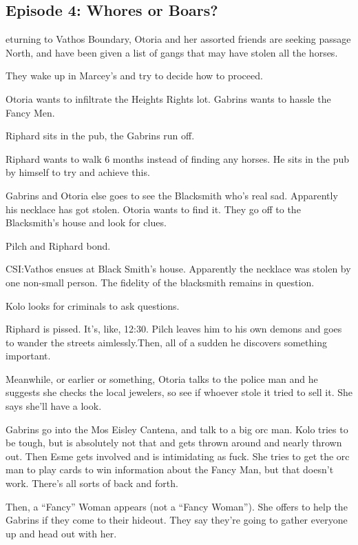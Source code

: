 \subsection{Episode 4: Whores or Boars?}

eturning to Vathos Boundary, Otoria and her assorted friends are seeking passage North, and have been given a list of gangs that may have stolen all the horses.\medskip

They wake up in Marcey’s and try to decide how to proceed.\medskip

Otoria wants to infiltrate the Heights Rights lot. Gabrins wants to hassle the Fancy Men.\medskip

Riphard sits in the pub, the Gabrins run off.\medskip

Riphard wants to walk 6 months instead of finding any horses. He sits in the pub by himself to try and achieve this.\medskip

Gabrins and Otoria else goes to see the Blacksmith who’s real sad. Apparently his necklace has got stolen. Otoria wants to find it. They go off to the Blacksmith’s house and look for clues.\medskip

Pilch and Riphard bond.\medskip

CSI:Vathos ensues at Black Smith’s house. Apparently the necklace was stolen by one non-small person. The fidelity of the blacksmith remains in question.\medskip

Kolo looks for criminals to ask questions.\medskip

Riphard is pissed. It’s, like, 12:30. Pilch leaves him to his own demons and goes to wander the streets aimlessly.Then, all of a sudden he discovers something important.\medskip

Meanwhile, or earlier or something, Otoria talks to the police man and he suggests she checks the local jewelers, so see if whoever stole it tried to sell it. She says she’ll have a look.\medskip

Gabrins go into the Mos Eisley Cantena, and talk to a big orc man. Kolo tries to be tough, but is absolutely not that and gets thrown around and nearly thrown out. Then Esme gets involved and is intimidating as fuck. She tries to get the orc man to play cards to win information about the Fancy Man, but that doesn’t work. There’s all sorts of back and forth.\medskip

Then, a “Fancy” Woman appears (not a “Fancy Woman”). She offers to help the Gabrins if they come to their hideout. They say they’re going to gather everyone up and head out with her.\medskip

